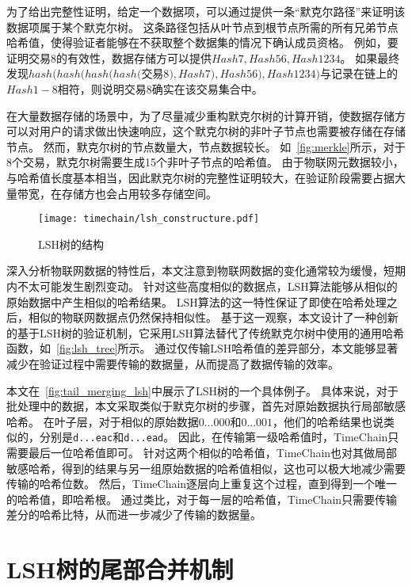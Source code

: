 为了给出完整性证明，给定一个数据项，可以通过提供一条“默克尔路径”来证明该数据项属于某个默克尔树。
这条路径包括从叶节点到根节点所需的所有兄弟节点哈希值，使得验证者能够在不获取整个数据集的情况下确认成员资格。
例如，要证明交易8的有效性，数据存储方可以提供$Hash7, Hash56, Hash1234$。
如果最终发现$hash(hash(hash(hash($交易8$),Hash7),Hash56),Hash1234)$与记录在链上的$Hash1-8$相符，则说明交易8确实在该交易集合中。

在大量数据存储的场景中，为了尽量减少重构默克尔树的计算开销，使数据存储方可以对用户的请求做出快速响应，这个默克尔树的非叶子节点也需要被存储在存储节点。
然而，默克尔树的节点数量大，节点数据较长。
如~\autoref{fig:merkle}所示，对于8个交易，默克尔树需要生成15个非叶子节点的哈希值。
由于物联网元数据较小，与哈希值长度基本相当，因此默克尔树的完整性证明较大，在验证阶段需要占据大量带宽，在存储方也会占用较多存储空间。

\begin{figure}[t]
    \centering
    \texttt{[image: timechain/lsh\_constructure.pdf]}
    \caption{LSH树的结构}
    \label{fig:lsh_tree}
\end{figure}

深入分析物联网数据的特性后，本文注意到物联网数据的变化通常较为缓慢，短期内不太可能发生剧烈变动。
针对这些高度相似的数据点，LSH算法能够从相似的原始数据中产生相似的哈希结果。
LSH算法的这一特性保证了即使在哈希处理之后，相似的物联网数据点仍然保持相似性。
基于这一观察，本文设计了一种创新的基于LSH树的验证机制，它采用LSH算法替代了传统默克尔树中使用的通用哈希函数，如~\autoref{fig:lsh_tree}所示。
通过仅传输LSH哈希值的差异部分，本文能够显著减少在验证过程中需要传输的数据量，从而提高了数据传输的效率。

本文在~\autoref{fig:tail_merging_lsh}中展示了LSH树的一个具体例子。
具体来说，对于批处理中的数据，本文采取类似于默克尔树的步骤，首先对原始数据执行局部敏感哈希。
在叶子层，对于相似的原始数据$0...000$和$0...001$，他们的哈希结果也说类似的，分别是\texttt{d...eac}和\texttt{d...ead}。
因此，在传输第一级哈希值时，TimeChain只需要最后一位哈希值即可。
针对这两个相似的哈希值，TimeChain也对其做局部敏感哈希，得到的结果与另一组原始数据的哈希值相似，这也可以极大地减少需要传输的哈希位数。
然后，TimeChain逐层向上重复这个过程，直到得到一个唯一的哈希值，即哈希根。
通过类比，对于每一层的哈希值，TimeChain只需要传输差分的哈希比特，从而进一步减少了传输的数据量。

\section{LSH树的尾部合并机制}

